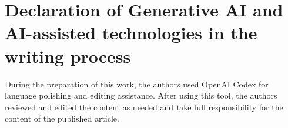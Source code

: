 \documentclass[a4paper,fleqn]{cas-sc}
\begin{document}
	\section*{Declaration of Generative AI and AI-assisted technologies in the writing process}
	\noindent During the preparation of this work, the authors used OpenAI Codex for language polishing and editing assistance. After using this tool, the authors reviewed and edited the content as needed and take full responsibility for the content of the published article.
	
	
	
	
\end{document}
